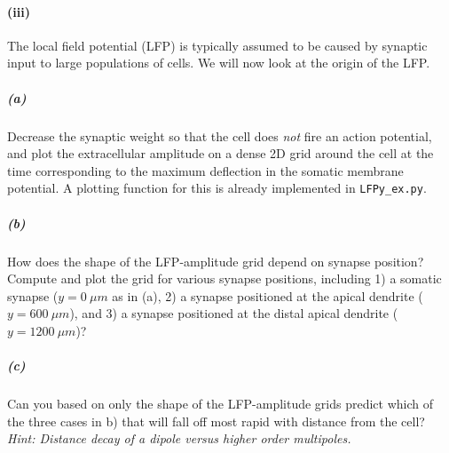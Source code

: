 \documentclass[a4paper,12pt]{article}
\begin{document}
\paragraph{(iii)} The local field potential (LFP) is typically assumed to be caused by synaptic input to large populations of cells. We will now look at the origin of the LFP. 

\subparagraph {(a)} Decrease the synaptic weight so that the cell does \emph{not} fire an action potential, and plot the extracellular amplitude on a dense 2D grid around the cell at the time corresponding to the maximum deflection in the somatic membrane potential. A plotting function for this is already implemented in  \texttt{LFPy\_ex.py}. 

\subparagraph {(b)} How does the shape of the LFP-amplitude grid depend on synapse position? Compute and plot the grid for various synapse positions, including 1) a somatic synapse ($y=0\ \mu m$ as in (a),  2) a synapse positioned at the apical dendrite ($y=600\ \mu m$), and 3) a synapse positioned at the distal apical dendrite ($y=1200\ \mu m$)? 

\subparagraph {(c)} Can you based on only the shape of the LFP-amplitude grids predict which of the three cases in b) that will fall off most rapid with distance from the cell?\\
{\it Hint: Distance decay of a dipole versus higher order multipoles.}
\end{document}
